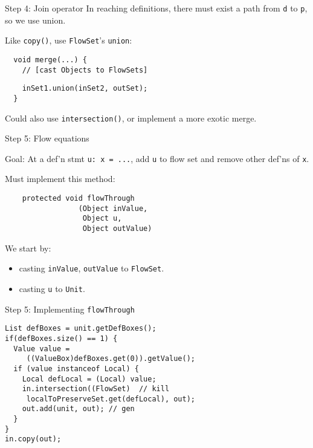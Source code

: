 \begin{slide}{Step 4: Join operator}
In reaching definitions, there must exist a path from {\tt d} to
{\tt p}, so we use union.

\qquad

Like {\tt copy()}, use {\tt FlowSet}'s {\tt union}:

\vspace*{0.05in}

\begin{verbatim}
  void merge(...) {
    // [cast Objects to FlowSets]
\end{verbatim}
{\green\verb+    inSet1.union(inSet2, outSet);+}\\
\verb+  }+

\vspace*{0.1in}

Could also use {\tt intersection()}, or implement a more exotic merge.

\end{slide}

\begin{slide}{Step 5: Flow equations}
\vspace*{-0.1in}

Goal: At a def'n stmt {\tt u: x = ...}, add {\tt u} to
flow set and remove other def'ns of {\tt x}.

\vspace*{0.1in}

Must implement this method:
\begin{verbatim}
    protected void flowThrough
                 (Object inValue, 
                  Object u, 
                  Object outValue)
\end{verbatim}

We start by:
\begin{itemize}
\item casting {\tt inValue}, {\tt outValue} to {\tt FlowSet}.

\item casting {\tt u} to {\tt Unit}.
\end{itemize}
\end{slide}

\begin{slide}{Step 5: Implementing {\tt flowThrough}}
\vspace*{-0.15in}
{\small
\begin{verbatim}
List defBoxes = unit.getDefBoxes();
if(defBoxes.size() == 1) {
  Value value = 
     ((ValueBox)defBoxes.get(0)).getValue();
  if (value instanceof Local) {
    Local defLocal = (Local) value;    
    in.intersection((FlowSet)  // kill
     localToPreserveSet.get(defLocal), out);
    out.add(unit, out); // gen
  }
}
in.copy(out);
\end{verbatim}}
\end{slide}

